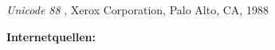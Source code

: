 \newpage
{}
  \begin{thebibliography}{}



	 {\sl Unicode 88} , Xerox Corporation, Palo Alto, CA, 1988
	
	\textbf{Internetquellen:}
	 

\end{thebibliography}
